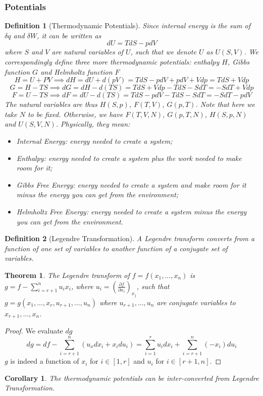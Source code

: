 \documentclass[a4paper]{article}
\newtheorem{defi}{Definition}[section]
\newtheorem{thm}{Theorem}[section]
\newtheorem{cor}{Corollary}[section]
\theoremstyle{new}
\begin{document}
\subsubsection*{Potentials}
\begin{defi}[Thermodynamic Potentials]
Since internal energy is the sum of $\delta q$ and $\delta W$, it can be written as
$$dU=TdS-pdV$$
where $S$ and $V$ are natural variables of $U$, such that we denote $U$ as $U(S,V)$. We correspondingly define three more thermodynamic potentials: enthalpy $H$, Gibbs function $G$ and Helmholtz function $F$
$$H=U+PV\implies dH=dU+d(pV)=TdS-pdV+pdV+Vdp=TdS+Vdp$$
$$G=H-TS\implies dG=dH-d(TS)=TdS+Vdp-TdS-SdT=-SdT+Vdp$$
$$F=U-TS\implies dF=dU-d(TS)=TdS-pdV-TdS-SdT=-SdT-pdV$$
The natural variables are thus $H(S,p)$, $F(T,V)$, $G(p,T)$. Note that here we take $N$ to be fixed. Otherwise, we have $F(T,V,N)$, $G(p,T,N)$, $H(S,p,N)$ and $U(S,V,N)$. Physically, they mean:
\begin{itemize}
    \item Internal Energy: energy needed to create a system;
    \item Enthalpy: energy needed to create a system plus the work needed to make room for it;
    \item Gibbs Free Energy: energy needed to create a system and make room for it minus the energy you can get from the environment;
    \item Helmholtz Free Energy: energy needed to create a system minus the energy you can get from the environment.
\end{itemize}
\end{defi}
\begin{defi}[Legendre Transformation]
A Legendre transform converts from a function of one set of variables to another function of a conjugate set of variables. 
\end{defi}
\begin{thm}
The Legendre transform of $f=f(x_1,...,x_n)$ is $g=f-\sum_{i=r+1}^nu_ix_i$, where $u_i=(\frac{\partial f}{\partial x_i})_{x_j}$, such that $g=g(x_1,...,x_r,u_{r+1},...,u_n)$ where $u_{r+1},...,u_n$ are conjugate variables to $x_{r+1},...,x_n$.
\end{thm}
\begin{proof}
We evaluate $dg$
$$dg=df-\sum_{i=r+1}^n(u_xdx_i+x_idu_i)=\sum_{i=1}^ru_idx_i+\sum_{i=r+1}^n(-x_i)du_i$$
$g$ is indeed a function of $x_i$ for $i\in[1,r]$ and $u_i$ for $i\in[r+1,n]$.
\end{proof}
\begin{cor}
The thermodynamic potentials can be inter-converted from Legendre Transformation.
\end{cor}
\end{document}
